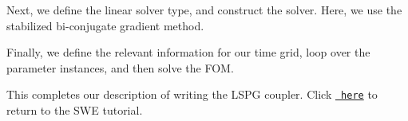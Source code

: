 Next, we define the linear solver type, and construct the solver. Here, we use the stabilized bi-\/conjugate gradient method. 
\begin{DoxyCode}{0}
\end{DoxyCode}


Finally, we define the relevant information for our time grid, loop over the parameter instances, and then solve the F\+OM. 
\begin{DoxyCode}{0}
\end{DoxyCode}


This completes our description of writing the L\+S\+PG coupler. Click \href{./md_pages_tutorials_tutorial3.html}{\texttt{ here}} to return to the S\+WE tutorial. 